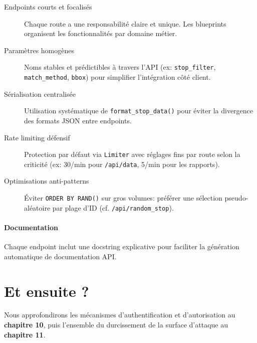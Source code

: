\begin{description}
  \item[Endpoints courts et focalisés] Chaque route a une responsabilité claire et unique. Les blueprints organisent les fonctionnalités par domaine métier.
  
  \item[Paramètres homogènes] Noms stables et prédictibles à travers l'API (ex: \texttt{stop\_filter}, \texttt{match\_method}, \texttt{bbox}) pour simplifier l'intégration côté client.
  
  \item[Sérialisation centralisée] Utilisation systématique de \texttt{format\_stop\_data()} pour éviter la divergence des formats JSON entre endpoints.
  
  \item[Rate limiting défensif] Protection par défaut via \texttt{Limiter} avec réglages fins par route selon la criticité (ex: 30/min pour \texttt{/api/data}, 5/min pour les rapports).
  
  \item[Optimisations anti-patterns] Éviter \texttt{ORDER BY RAND()} sur gros volumes: préférer une sélection pseudo-aléatoire par plage d'ID (cf. \texttt{/api/random\_stop}).
\end{description}

\paragraph{Documentation} Chaque endpoint inclut une docstring explicative pour faciliter la génération automatique de documentation API.

\section*{Et ensuite ?}
Nous approfondirons les mécanismes d'authentification et d'autorisation au \textbf{chapitre 10}, puis l'ensemble du durcissement de la surface d'attaque au \textbf{chapitre 11}. 
